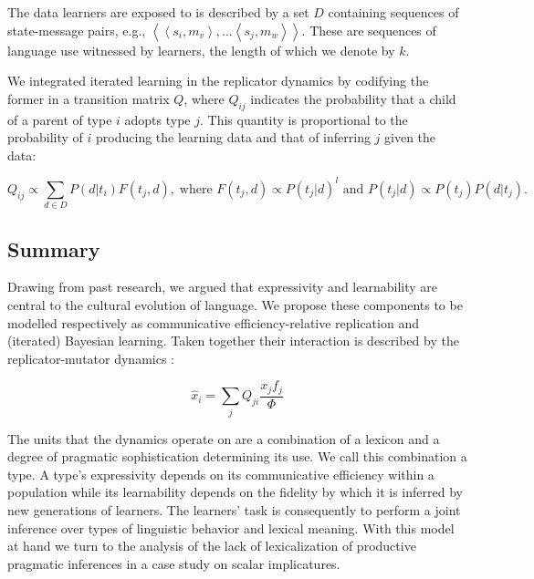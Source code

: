 \documentclass[a4paper]{article}
\newcommand{\tuple}[1]{\ensuremath{\left\langle #1 \right\rangle}}
\begin{document}
The data learners are exposed to is described by a set $D$ containing sequences of state-message pairs, e.g., $\tuple{\tuple{s_i,m_v},...\tuple{s_j,m_w}}$. These are sequences of language use witnessed by learners, the length of which we denote by $k$. %

We integrated iterated learning in the replicator dynamics by codifying the former in a transition matrix $Q$, where $Q_{ij}$ indicates the probability that a child of a parent of type $i$ adopts type $j$. This quantity is proportional to the probability of $i$ producing the learning data and that of inferring $j$ given the data: 


\[
 Q_{ij} \propto \sum_{d \in D} P(d|t_i) F(t_j,d), \; \text{where } F(t_j,d) \propto P(t_j|d)^l \text{ and } P(t_j|d) \propto P(t_j) P(d|t_j).
\]

\subsection{Summary}
Drawing from past research, we argued that expressivity and learnability are central to the cultural evolution of language. We propose these components to be modelled respectively as communicative efficiency-relative replication and (iterated) Bayesian learning. Taken together their interaction is described by the replicator-mutator dynamics \citep{hofbauer+sigmund:2003}: 

\[ 
\hat{x}_i = \sum_j Q_{ji} \frac{x_jf_j}{\Phi}
\]

The units that the dynamics operate on are a combination of a lexicon and a degree of pragmatic sophistication determining its use. We call this combination a type. A type's expressivity depends on its communicative efficiency within a population while its learnability depends on the fidelity by which it is inferred by new generations of learners. The learners' task is consequently to perform a joint inference over types of linguistic behavior and lexical meaning. With this model at hand we turn to the analysis of the lack of lexicalization of productive pragmatic inferences in a case study on scalar implicatures. 
\end{document}
